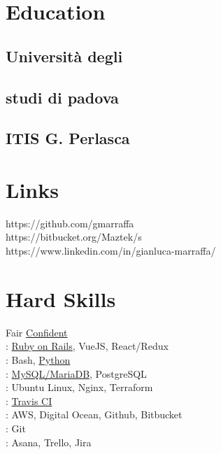 \documentclass[]{deedy-resume-openfont}
\begin{document}
\begin{minipage}[t]{0.33\textwidth} 


\section{Education} 

\subsection{Università degli}
\subsection{studi di padova}
\sectionsep

\subsection{ITIS G. Perlasca}
\sectionsep


\section{Links} 
https://github.com/gmarraffa \\
https://bitbucket.org/Maztek/s \\
https://www.linkedin.com/in/gianluca-marraffa/ 
\sectionsep


\section{Hard Skills}
Fair \textbullet{} \underline{Confident}\\
: \underline{Ruby on Rails}, VueJS, React/Redux\\
: Bash, \underline{Python} \\
: \underline{MySQL/MariaDB}, PostgreSQL \\
: Ubuntu Linux, Nginx, Terraform\\
: \underline{Travis CI}\\
: AWS, Digital Ocean, Github, Bitbucket \\
: Git\\
: Asana, Trello, Jira


\end{minipage}
\end{document}
